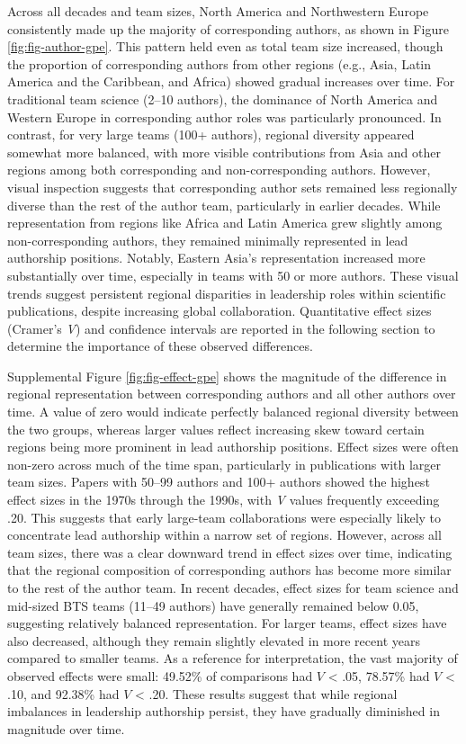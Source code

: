 \documentclass[
  man,floatsintext]{apa7}
\begin{document}
Across all decades and team sizes, North America and Northwestern Europe
consistently made up the majority of corresponding authors, as shown in
Figure \ref{fig:fig-author-gpe}. This pattern held even as total
team size increased, though the proportion of corresponding authors from
other regions (e.g., Asia, Latin America and the Caribbean, and Africa)
showed gradual increases over time. For traditional team science (2--10
authors), the dominance of North America and Western Europe in
corresponding author roles was particularly pronounced. In contrast, for
very large teams (100+ authors), regional diversity appeared somewhat
more balanced, with more visible contributions from Asia and other
regions among both corresponding and non-corresponding authors. However,
visual inspection suggests that corresponding author sets remained less
regionally diverse than the rest of the author team, particularly in
earlier decades. While representation from regions like Africa and Latin
America grew slightly among non-corresponding authors, they remained
minimally represented in lead authorship positions. Notably, Eastern
Asia's representation increased more substantially over time, especially
in teams with 50 or more authors. These visual trends suggest persistent
regional disparities in leadership roles within scientific publications,
despite increasing global collaboration. Quantitative effect sizes
(Cramer's \emph{V}) and confidence intervals are reported in the following
section to determine the importance of these observed differences.

Supplemental Figure \ref{fig:fig-effect-gpe} shows the magnitude of the difference in
regional representation between corresponding authors and all other
authors over time. A value of zero would indicate perfectly balanced
regional diversity between the two groups, whereas larger values reflect
increasing skew toward certain regions being more prominent in lead
authorship positions. Effect sizes were often non-zero across much of
the time span, particularly in publications with larger team sizes.
Papers with 50--99 authors and 100+ authors showed the highest effect
sizes in the 1970s through the 1990s, with \emph{V} values frequently
exceeding .20. This suggests that early large-team collaborations were
especially likely to concentrate lead authorship within a narrow set of
regions. However, across all team sizes, there was a clear downward
trend in effect sizes over time, indicating that the regional
composition of corresponding authors has become more similar to the rest
of the author team. In recent decades, effect sizes for team science and
mid-sized BTS teams (11--49 authors) have generally remained below 0.05,
suggesting relatively balanced representation. For larger teams, effect
sizes have also decreased, although they remain slightly elevated in
more recent years compared to smaller teams. As a reference for
interpretation, the vast majority of observed effects were small:
49.52\% of
comparisons had \(V\) \textless{} .05,
78.57\% had \(V\) \textless{}
.10, and 92.38\%
had \(V\) \textless{} .20. These results suggest that while regional imbalances in
leadership authorship persist, they have gradually diminished in
magnitude over time.
\end{document}
